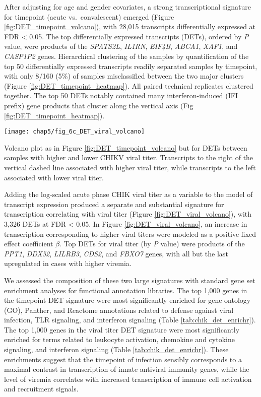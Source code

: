 After adjusting for age and gender covariates, a strong transcriptional signature for timepoint (acute vs.\ convalescent) emerged (Figure \ref{fig:DET_timepoint_volcano}), with 28,015 transcripts differentially expressed at FDR < 0.05. The top differentially expressed transcripts (DETs), ordered by \emph{P} value, were products of the \emph{SPATS2L}, \emph{IL1RN}, \emph{EIF4B}, \emph{ABCA1}, \emph{XAF1}, and \emph{CASP1P2} genes. Hierarchical clustering of the samples by quantification of the top 50 differentially expressed transcripts readily separated samples by timepoint, with only 8/160 (5\%) of samples misclassified between the two major clusters (Figure \ref{fig:DET_timepoint_heatmap}). All paired technical replicates clustered together. The top 50 DETs notably contained many interferon-induced (IFI prefix) gene products that cluster along the vertical axis (Fig \ref{fig:DET_timepoint_heatmap}).

\begin{marginfigure}
  \centering
  \texttt{[image: chap5/fig\_6c\_DET\_viral\_volcano]}
  \caption[Volcano plot of differentially expressed host transcripts for viremic load]{
  Volcano plot as in Figure \ref{fig:DET_timepoint_volcano} but for DETs between samples with higher and lower CHIKV viral titer. Transcripts to the right of the vertical dashed line associated with higher viral titer, while transcripts to the left associated with lower viral titer. 
  }
  \label{fig:DET_viral_volcano}
\end{marginfigure}

Adding the log-scaled acute phase CHIK viral titer as a variable to the model of transcript expression produced a separate and substantial signature for transcription correlating with viral titer (Figure \ref{fig:DET_viral_volcano}), with 3,326 DETs at FDR < 0.05. In Figure \ref{fig:DET_viral_volcano}, an increase in transcription corresponding to higher viral titers were modeled as a positive fixed effect coefficient $\beta$. Top DETs for viral titer (by \emph{P} value) were products of the \emph{PPT1}, \emph{DDX52}, \emph{LILRB3}, \emph{CDS2}, and \emph{FBXO7} genes, with all but the last upregulated in cases with higher viremia.

We assessed the composition of these two large signatures with standard gene set enrichment analyses for functional annotation libraries. The top 1,000 genes in the timepoint DET signature were most significantly enriched for gene ontology (GO), Panther, and Reactome annotations related to defense against viral infection, TLR signaling, and interferon signaling (Table \ref{tab:chik_det_enrichr}). The top 1,000 genes in the viral titer DET signature were most significantly enriched for terms related to leukocyte activation, chemokine and cytokine signaling, and interferon signaling (Table \ref{tab:chik_det_enrichr}). These enrichments suggest that the timepoint of infection sensibly corresponds to a maximal contrast in transcription of innate antiviral immunity genes, while the level of viremia correlates with increased transcription of immune cell activation and recruitment signals.

